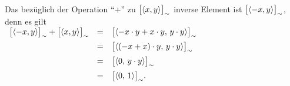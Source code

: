 \\[0.2cm]
Das bez\"{u}glich der Operation ``$+$'' zu $\bigl[\pair(x,y)\bigr]_\sim$ inverse Element ist
$\bigl[\pair(-x,y)\bigr]_\sim$, denn es gilt
\\[0.2cm]
\hspace*{1.3cm}
$
\begin{array}[t]{lcl}
      \bigl[\pair(-x,y)\bigr]_\sim + \bigl[\pair(x,y)\bigr]_\sim 
& = & \bigl[\pair(-x \cdot y + x \cdot y,\, y \cdot y)\bigr]_\sim      \\[0.2cm]
& = & \bigl[\pair((-x + x) \cdot y,\, y \cdot y)\bigr]_\sim      \\[0.2cm]
& = & \bigl[\pair(0,\, y \cdot y)\bigr]_\sim      \\[0.2cm]
& = & \bigl[\pair(0,\, 1) \bigr]_\sim.
\end{array}
$
\vspace*{0.2cm}

